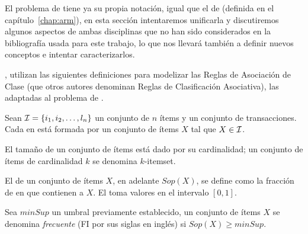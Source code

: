 El problema de \Clasificacion tiene ya su propia notación, igual que el de \arm (definida en el capítulo~\ref{chap:arm}), en esta sección intentaremos unificarla y discutiremos algunos aspectos de ambas disciplinas que no han sido considerados en la bibliografía usada para este trabajo, lo que nos llevará también a definir nuevos conceptos e intentar caracterizarlos.




\cite{HLeonCarrascoHPalancarMTrinidad-DesarrolloDeClasificadoresBasadosEnRA-2010}, utilizan las siguientes definiciones para modelizar las Reglas de Asociación de Clase (que otros autores denominan Reglas de Clasificación Asociativa), las \ars adaptadas al problema de \Clasificacion.

Sean $\I = \{i_1,i_2,\ldots,l_n\}$ un conjunto de $n$ ítems y \T un conjunto de transacciones. Cada \transaccion en \T está formada por un conjunto de ítems $X$ tal que $X\in\I$.
\begin{Definition}[\Itemset]
  El tamaño de un conjunto de ítems está dado por su cardinalidad; un conjunto de ítems de cardinalidad $k$ se denomina $k$-itemset.
\label{def:itemset}
\end{Definition}

\begin{Definition}[Soporte]
  El \soporte de un conjunto de ítems $X$, en adelante $Sop(X)$, se define como la fracción de \transacciones en \T que contienen a $X$. El \soporte toma valores en el intervalo $[0,1]$.
\label{def:soporte}
\end{Definition}

\begin{Definition}[$minSup$]
  Sea $minSup$ un umbral previamente establecido, un conjunto de ítems $X$ se denomina \emph{frecuente} (FI por sus siglas en inglés) si $Sop(X) \geq minSup$.
\label{def:flujo-de-datos}
\end{Definition}


